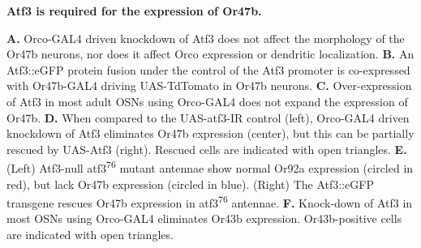 {\bf Atf3 is required for the expression of Or47b.}

\textbf{A.} Orco-GAL4 driven knockdown of Atf3 does not affect the morphology of the Or47b neurons, nor does it affect Orco expression or dendritic localization.
\textbf{B.} An Atf3::eGFP protein fusion under the control of the Atf3 promoter is co-expressed with Or47b-GAL4 driving UAS-TdTomato in Or47b neurons.
\textbf{C.} Over-expression of Atf3 in most adult OSNs using Orco-GAL4 does not expand the expression of Or47b.
\textbf{D.} When compared to the UAS-atf3-IR control (left), Orco-GAL4 driven knockdown of Atf3 eliminates Or47b expression (center), but this can be partially rescued by UAS-Atf3 (right). Rescued cells are indicated with open triangles.
\textbf{E.} (Left) Atf3-null atf3\textsuperscript{76} mutant antennae show normal Or92a expression (circled in red), but lack Or47b expression (circled in blue). (Right) The Atf3::eGFP transgene rescues Or47b expression in atf3\textsuperscript{76} antennae.
\textbf{F.} Knock-down of Atf3 in most OSNs using Orco-GAL4 eliminates Or43b expression. Or43b-positive cells are indicated with open triangles.
\label{fig:3}
